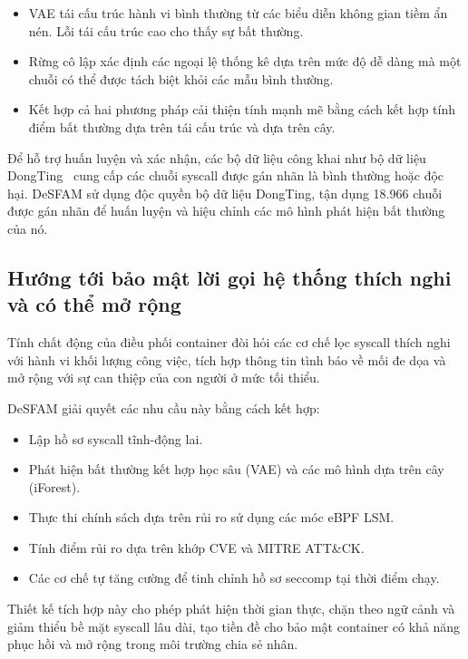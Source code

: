 \begin{itemize}
  \item VAE tái cấu trúc hành vi bình thường từ các biểu diễn không gian tiềm ẩn nén. Lỗi tái cấu trúc
        cao cho thấy sự bất thường.
  \item Rừng cô lập xác định các ngoại lệ thống kê dựa trên mức độ dễ dàng mà một chuỗi có thể được
        tách biệt khỏi các mẫu bình thường.
  \item Kết hợp cả hai phương pháp cải thiện tính mạnh mẽ bằng cách kết hợp tính điểm bất thường dựa
        trên tái cấu trúc và dựa trên cây.
\end{itemize}

Để hỗ trợ huấn luyện và xác nhận, các bộ dữ liệu công khai như bộ dữ liệu DongTing~\cite{ref26_dongtingdataset} cung cấp các chuỗi syscall được gán nhãn là bình thường hoặc độc hại. DeSFAM sử dụng độc quyền bộ dữ liệu DongTing, tận dụng 18.966 chuỗi được gán nhãn để huấn luyện và hiệu chỉnh các mô hình phát hiện bất thường của nó.

\subsection{Hướng tới bảo mật lời gọi hệ thống thích nghi và có thể mở rộng}
\label{subsec:adaptive_security}

Tính chất động của điều phối container đòi hỏi các cơ chế lọc syscall thích nghi với hành vi khối lượng công việc, tích hợp thông tin tình báo về mối đe dọa và mở rộng với sự can thiệp của con người ở mức tối thiểu.

DeSFAM giải quyết các nhu cầu này bằng cách kết hợp:
\begin{itemize}
  \item Lập hồ sơ syscall tĩnh-động lai.
  \item Phát hiện bất thường kết hợp học sâu (VAE) và các mô hình dựa trên cây (iForest).
  \item Thực thi chính sách dựa trên rủi ro sử dụng các móc eBPF LSM.
  \item Tính điểm rủi ro dựa trên khớp CVE và MITRE ATT\&CK.
  \item Các cơ chế tự tăng cường để tinh chỉnh hồ sơ seccomp tại thời điểm chạy.
\end{itemize}

Thiết kế tích hợp này cho phép phát hiện thời gian thực, chặn theo ngữ cảnh và giảm thiểu bề mặt syscall lâu dài, tạo tiền đề cho bảo mật container có khả năng phục hồi và mở rộng trong môi trường chia sẻ nhân.

